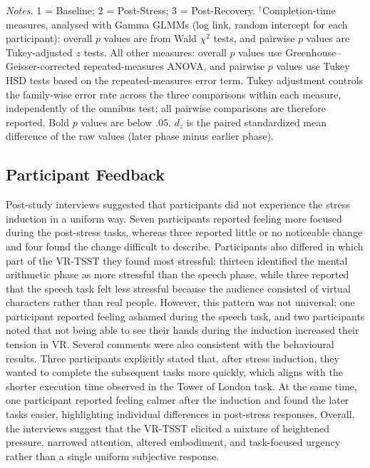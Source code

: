 \begin{table}[t]
\medskip
\begin{minipage}{0.98\textwidth}
\footnotesize
\textit{Notes.} 1 = Baseline; 2 = Post-Stress; 3 = Post-Recovery.
$^{\dagger}$Completion-time measures, analysed with Gamma GLMMs (log link, random intercept for each participant): overall $p$ values are from Wald $\chi^2$ tests, and pairwise $p$ values are Tukey-adjusted $z$ tests.
All other measures: overall $p$ values use Greenhouse--Geisser-corrected repeated-measures ANOVA, and pairwise $p$ values use Tukey HSD tests based on the repeated-measures error term.
Tukey adjustment controls the family-wise error rate across the three comparisons within each measure, independently of the omnibus test; all pairwise comparisons are therefore reported.
Bold $p$ values are below .05.
$d_z$ is the paired standardized mean difference of the raw values (later phase minus earlier phase).
\end{minipage}
\end{table}

\subsection{Participant Feedback}
Post-study interviews suggested that participants did not experience the stress induction in a uniform way. Seven participants reported feeling more focused during the post-stress tasks, whereas three reported little or no noticeable change and four found the change difficult to describe. Participants also differed in which part of the VR-TSST they found most stressful: thirteen identified the mental arithmetic phase as more stressful than the speech phase, while three reported that the speech task felt less stressful because the audience consisted of virtual characters rather than real people. However, this pattern was not universal; one participant reported feeling ashamed during the speech task, and two participants noted that not being able to see their hands during the induction increased their tension in VR.
Several comments were also consistent with the behavioural results. Three participants explicitly stated that, after stress induction, they wanted to complete the subsequent tasks more quickly, which aligns with the shorter execution time observed in the Tower of London task. At the same time, one participant reported feeling calmer after the induction and found the later tasks easier, highlighting individual differences in post-stress responses. Overall, the interviews suggest that the VR-TSST elicited a mixture of heightened pressure, narrowed attention, altered embodiment, and task-focused urgency rather than a single uniform subjective response.

